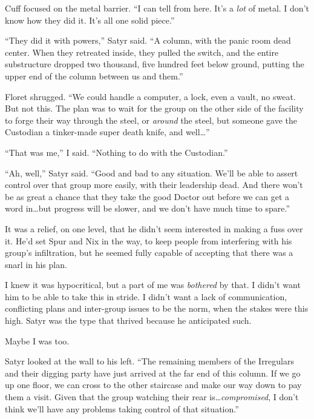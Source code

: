 Cuff focused on the metal barrier.  ``I can tell from here.  It's a \emph{lot} of metal.  I don't know how they did it.  It's all one solid piece.''



``They did it with powers,'' Satyr said.  ``A column, with the panic room dead center.  When they retreated inside, they pulled the switch, and the entire substructure dropped two thousand, five hundred feet below ground, putting the upper end of the column between us and them.''



Floret shrugged.  ``We could handle a computer, a lock, even a vault, no sweat.  But not this.  The plan was to wait for the group on the other side of the facility to forge their way through the steel, or \emph{around} the steel, but someone gave the Custodian a tinker-made super death knife, and well\ldots''



``That was me,'' I said.  ``Nothing to do with the Custodian.''



``Ah, well,'' Satyr said.  ``Good and bad to any situation.  We'll be able to assert control over that group more easily, with their leadership dead.  And there won't be as great a chance that they take the good Doctor out before we can get a word in\ldots but progress will be slower, and we don't have much time to spare.''



It was a relief, on one level, that he didn't seem interested in making a fuss over it.  He'd set Spur and Nix in the way, to keep people from interfering with his group's infiltration, but he seemed fully capable of accepting that there was a snarl in his plan.



I knew it was hypocritical, but a part of me was \emph{bothered} by that.  I didn't want him to be able to take this in stride.  I didn't want a lack of communication, conflicting plans and inter-group issues to be the norm, when the stakes were this high.  Satyr was the type that thrived because he anticipated such.



Maybe I was too.



Satyr looked at the wall to his left.  ``The remaining members of the Irregulars and their digging party have just arrived at the far end of this column.  If we go up one floor, we can cross to the other staircase and make our way down to pay them a visit.  Given that the group watching their rear is\ldots \emph{compromised}, I don't think we'll have any problems taking control of that situation.''



